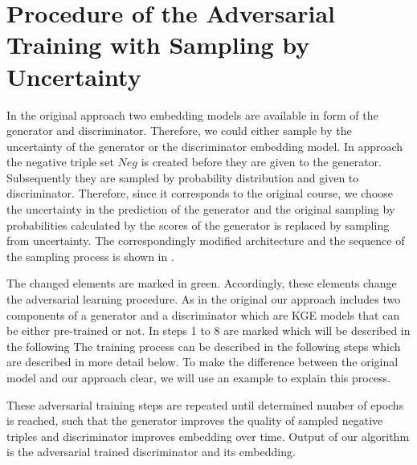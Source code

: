 \section{Procedure of the Adversarial Training with Sampling by Uncertainty}
\label{sec:procedure}

In the original \kbgan approach two embedding models are available in form of the generator and discriminator.
Therefore, we could either sample by the uncertainty of the generator or the discriminator embedding model.
In \kbgan approach the negative triple set $Neg$ is created before they are given to the generator.
Subsequently they are sampled by probability distribution and given to discriminator.
Therefore, since it corresponds to the original course, we choose the uncertainty in the prediction of the generator and the original sampling by probabilities calculated by the scores of the generator is replaced by sampling from uncertainty.
The correspondingly modified architecture and the sequence of the sampling process is shown in .

The changed elements are marked in green.
Accordingly, these elements change the adversarial learning procedure.
As in the original \kbgan our approach includes two components of a generator and a discriminator which are \ac{KGE} models that can be either pre-trained or not.
In  steps 1 to 8 are marked which will be described in the following 
The training process can be described in the following steps
which are described in more detail below.
To make the difference between the original model and our approach clear, we will use an example to explain this process.

















These adversarial training steps are repeated until determined number of epochs is reached, such that the generator improves the quality of sampled negative triples and discriminator improves embedding over time.
Output of our algorithm is the adversarial trained discriminator and its embedding.



